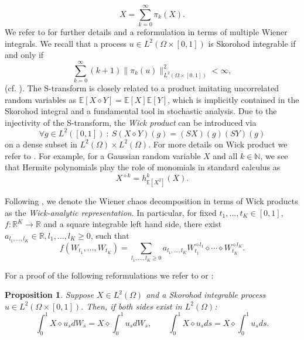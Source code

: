 \documentclass[a4paper,11pt,reqno]{amsart}
\theoremstyle{plain}
\newtheorem{proposition}[theorem]{Proposition}
\def\N{\mathbb{N}}
\def\R{\mathbb{R}}
\def\ex{\mathbb{E}}
\numberwithin{equation}{section}
\begin{document}
\[
X=\sum_{k=0}^{\infty} \pi_k(X).
\]
We refer to \cite{Janson, Holden_Buch} for further details and a reformulation in terms of multiple Wiener integrals. We recall that a process $u \in L^2(\Omega \times [0,1])$ is Skorohod integrable if and only if
\[
\sum_{k=0}^{\infty} (k+1) \|\pi_k(u)\|^2_{L^2(\Omega \times [0,1])} < \infty,
\]
(cf. \cite[Theorem 7.39]{Janson}).
The S-transform is closely related to a product imitating uncorrelated random variables as $\ex[X \diamond Y]=\ex[X]\ex[Y]$, which is implicitly contained in the Skorohod integral and a fundamental tool in stochastic analysis. Due to the injectivity of the S-transform, the \emph{Wick product} can be introduced via
\[
\forall g \in L^2([0,1]) \ : \ S(X \diamond Y)(g) = (S X)(g) (S Y)(g)
\]
on a dense subset in $L^{2}(\Omega) \times L^{2}(\Omega)$. For more details on Wick product we refer to \cite{Janson, Holden_Buch, Kuo}. For example, for a Gaussian random variable $X$ and all $k \in \N$, we see that Hermite polynomials play the role of monomials in standard calculus as
\[
X^{\diamond k} = h^k_{\ex[X^2]}(X).
\]

Following \cite{Holden_Buch, Buckdahn_Nualart}, we denote the Wiener chaos decomposition in terms of Wick products as the \emph{Wick-analytic representation}. In particular, for fixed $t_1, \ldots, t_K \in [0,1]$, $f: \R^K \rightarrow \R$ and a square integrable left hand side, there exist $a_{l_1, \ldots, l_K} \in \R, l_1, \ldots, l_K\geq 0$, such that
\begin{equation}\label{eq:WienerChaosByWickProducts}
f(W_{t_1}, \ldots, W_{t_K}) = \sum_{l_1, \ldots, l_K\geq 0} a_{l_1, \ldots, l_K} W_{t_1}^{\diamond l_1} \diamond \cdots \diamond W_{t_K}^{\diamond l_K}.
\end{equation}  

For a proof of the following reformulations we refer to \cite[Chapter 16]{Janson} or \cite[Proposition 7]{NP}:

\begin{proposition}\label{prop:SkorohodAndWick}
Suppose $X \in L^2(\Omega)$ and a Skorohod integrable process  $u\in L^2(\Omega \times [0,1])$. Then, if both sides exist in $L^2(\Omega)$:
\[
\int_{0}^{1} X \diamond u_s dW_s = X \diamond \int_{0}^{1} u_s dW_s, \qquad  \int_{0}^{1} X \diamond u_s ds = X \diamond \int_{0}^{1} u_s ds.
\]
\end{proposition}
\end{document}
